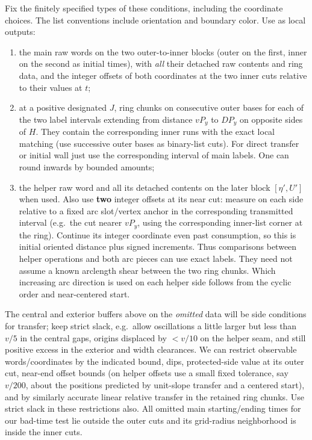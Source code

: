 Fix the finitely specified types of these conditions, including the coordinate choices.
The list conventions include orientation and boundary color. Use as local outputs:

\begin{enumerate}
\def\labelenumi{\arabic{enumi}.}
\item
  the main raw words on the two outer-to-inner blocks (outer on the first, inner on the
  second as initial times), with \emph{all} their detached raw contents and ring data, and
  the integer offsets of both coordinates at the two inner cuts relative to their values
  at \(t\);
\item
  at a positive designated \(J\), ring chunks on consecutive outer bases for each of the
  two label intervals extending from distance \(vP_y\) to \(D P_y\) on opposite sides of
  \(H\). They contain the corresponding inner runs with the exact local matching (use
  successive outer bases as binary-list cuts). For direct transfer or initial wall just
  use the corresponding interval of main labels. One can round inwards by bounded amounts;
\item
  the helper raw word and all its detached contents on the later block \([\eta',U']\) when
  used. Also use \textbf{two} integer offsets at its near cut: measure on each side
  relative to a fixed arc slot/vertex anchor in the corresponding transmitted interval
  (e.g.~the cut nearer \(vP_y\), using the corresponding inner-list corner at the ring).
  Continue its integer coordinate even past consumption, so this is initial oriented
  distance plus signed increments. Thus comparisons between helper operations and both arc
  pieces can use exact labels. They need not assume a known arclength shear between the
  two ring chunks. Which increasing arc direction is used on each helper side follows from
  the cyclic order and near-centered start.
\end{enumerate}

The central and exterior buffers above on the \emph{omitted} data will be side conditions
for transfer; keep strict slack, e.g.~allow oscillations a little larger but less than
\(v/5\) in the central gaps, origins displaced by \(<v/10\) on the helper seam, and still
positive excess in the exterior and width clearances. We can restrict observable
words/coordinates by the indicated bound, dips, protected-side value at its outer cut,
near-end offset bounds (on helper offsets use a small fixed tolerance, say \(v/200\),
about the positions predicted by unit-slope transfer and a centered start), and by
similarly accurate linear relative transfer in the retained ring chunks. Use strict slack
in these restrictions also. All omitted main starting/ending times for our bad-time test
lie outside the outer cuts and its grid-radius neighborhood is inside the inner cuts.

